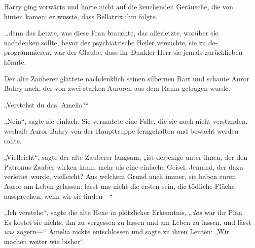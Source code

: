 Harry ging vorwärts und hörte nicht auf die keuchenden Geräusche, die von hinten kamen; er wusste, dass Bellatrix ihm folgte.

…denn das Letzte, was diese Frau brauchte, das allerletzte, worüber sie nachdenken sollte, bevor der psychiatrische Heiler versuchte, sie zu de-programmieren, war der Glaube, dass ihr Dunkler Herr sie jemals zurücklieben könnte.

\later

Der alte Zauberer glättete nachdenklich seinen silbernen Bart und schaute Auror Bahry nach, der von zwei starken Auroren aus dem Raum getragen wurde.

„Verstehst du das, Amelia?“

„Nein“, sagte sie einfach. Sie vermutete eine Falle, die sie noch nicht verstanden, weshalb Auror Bahry von der Haupttruppe ferngehalten und bewacht werden sollte.

„Vielleicht“, sagte der alte Zauberer langsam, „ist derjenige unter ihnen, der den Patronus-Zauber wirken kann, mehr als eine einfache Geisel. Jemand, der dazu verleitet wurde, vielleicht? Aus welchem Grund auch immer, sie haben euren Auror am Leben gelassen; lasst uns nicht die ersten sein, die tödliche Flüche aussprechen, wenn wir sie finden—“

„Ich verstehe“, sagte die alte Hexe in plötzlicher Erkenntnis, „\emph{das} war ihr Plan. Es kostet sie nichts, ihn zu vergessen zu lassen und am Leben zu lassen, und lässt \emph{uns} zögern—“ Amelia nickte entschlossen und sagte zu ihren Leuten: „Wir machen weiter wie bisher“.

